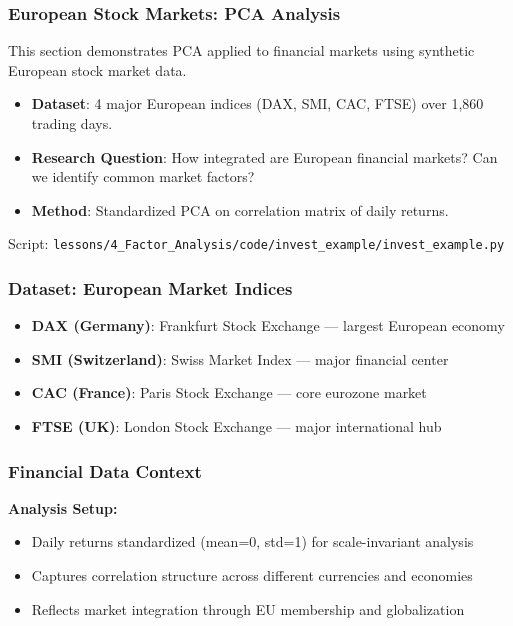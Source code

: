 \documentclass[aspectratio=169]{beamer}
\begin{document}
\begin{frame}
    \frametitle{European Stock Markets: PCA Analysis}
    This section demonstrates PCA applied to financial markets using synthetic European stock market data.
    \begin{itemize}
        \item \textbf{Dataset}: 4 major European indices (DAX, SMI, CAC, FTSE) over 1,860 trading days. \pause
        \item \textbf{Research Question}: How integrated are European financial markets? Can we identify common market factors? \pause
        \item \textbf{Method}: Standardized PCA on correlation matrix of daily returns. \pause
    \end{itemize}
    \vspace{6pt}
    Script: \texttt{lessons/4\_Factor\_Analysis/code/invest\_example/invest\_example.py}
\end{frame}

\begin{frame}
    \frametitle{Dataset: European Market Indices}
    \begin{itemize}
        \item \textbf{DAX (Germany)}: Frankfurt Stock Exchange — largest European economy \pause
        \item \textbf{SMI (Switzerland)}: Swiss Market Index — major financial center \pause
        \item \textbf{CAC (France)}: Paris Stock Exchange — core eurozone market \pause
        \item \textbf{FTSE (UK)}: London Stock Exchange — major international hub \pause
    \end{itemize}
\end{frame}

\begin{frame}
    \frametitle{Financial Data Context}
    \textbf{Analysis Setup:}
    \begin{itemize}
        \item Daily returns standardized (mean=0, std=1) for scale-invariant analysis \pause
        \item Captures correlation structure across different currencies and economies \pause
        \item Reflects market integration through EU membership and globalization \pause
    \end{itemize}
\end{frame}
\end{document}
